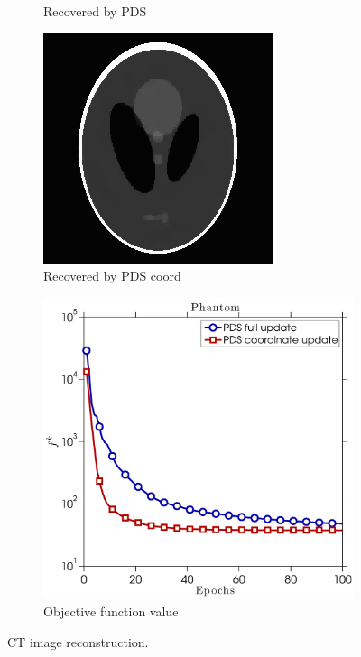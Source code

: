 \begin{figure}[!htb]
\begin{subfigure}{0.45\linewidth}
         \caption{Recovered by PDS}\label{fig:pds_b}		        
        \label{fig:a}
    \end{subfigure} %
    \begin{subfigure}{0.45\linewidth}
    	\centering
        \includegraphics[width=0.9\linewidth]{./figs/phantom_pds_coord_img.png}
         \caption{Recovered by PDS coord}\label{fig:pds_c}		        
        \label{fig:a}
    \end{subfigure} %
    \quad
    \begin{subfigure}{0.45\linewidth}
    	\centering
        \includegraphics[width=\linewidth]{./figs/phantom_func_val_cropped.pdf}
         \caption{Objective function value}\label{fig:pds_d}		                
        \label{fig:a}
    \end{subfigure} %
    \caption{CT image reconstruction.}
    \label{fig:pds_results}
\end{figure}


